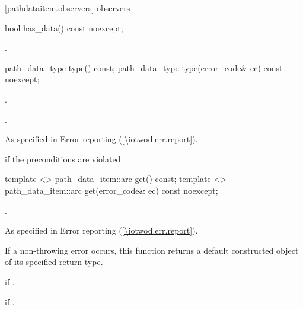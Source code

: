  [pathdataitem.observers] { observers}

\begin{itemdecl}
    bool has_data() const noexcept;
\end{itemdecl}
\begin{itemdescr}
	\pnum
	\returns
	.
	
\end{itemdescr}

\begin{itemdecl}
    path_data_type type() const;
    path_data_type type(error_code& ec) const noexcept;
\end{itemdecl}
\begin{itemdescr}
	\pnum
	\preconditions
	.
	
	\pnum
	\returns
	.
	
	\pnum
	\throws
	As specified in Error reporting (\ref{\iotwod.err.report}).
	
	\pnum
	\errors
	 if the preconditions are violated.

\end{itemdescr}

\begin{itemdecl}
    template <>
    path_data_item::arc get() const;
    template <>
    path_data_item::arc get(error_code& ec) const noexcept;
\end{itemdecl}
\begin{itemdescr}
	\pnum
	\returns
	.
	
	\pnum
	\throws
	As specified in Error reporting (\ref{\iotwod.err.report}).
	
	\pnum
	\remarks
	If a non-throwing error occurs, this function returns a default constructed object of its specified return type.
	
	\pnum
	\errors
	 if .
	
	\pnum
	 if .

\end{itemdescr}

